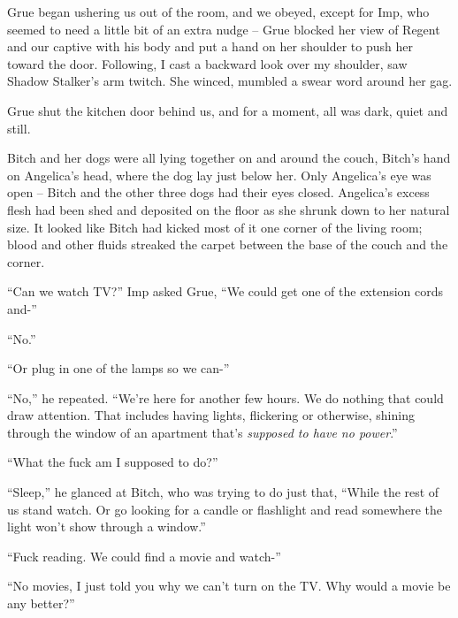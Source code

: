 Grue began ushering us out of the room, and we obeyed, except for Imp, who seemed to need a little bit of an extra nudge – Grue blocked her view of Regent and our captive with his body and put a hand on her shoulder to push her toward the door.  Following, I cast a backward look over my shoulder, saw Shadow Stalker's arm twitch.  She winced, mumbled a swear word around her gag.



Grue shut the kitchen door behind us, and for a moment, all was dark, quiet and still.



Bitch and her dogs were all lying together on and around the couch, Bitch's hand on Angelica's head, where the dog lay just below her.  Only Angelica's eye was open – Bitch and the other three dogs had their eyes closed.  Angelica's excess flesh had been shed and deposited on the floor as she shrunk down to her natural size.  It looked like Bitch had kicked most of it one corner of the living room; blood and other fluids streaked the carpet between the base of the couch and the corner.



``Can we watch TV?'' Imp asked Grue, ``We could get one of the extension cords and-''



``No.''



``Or plug in one of the lamps so we can-''



``No,'' he repeated.  ``We're here for another few hours.  We do nothing that could draw attention.  That includes having lights, flickering or otherwise, shining through the window of an apartment that's \emph{supposed to have no power}.''



``What the fuck am I supposed to do?''



``Sleep,'' he glanced at Bitch, who was trying to do just that, ``While the rest of us stand watch.  Or go looking for a candle or flashlight and read somewhere the light won't show through a window.''



``Fuck reading.  We could find a movie and watch-''



``No movies, I just told you why we can't turn on the TV.  Why would a movie be any better?''



